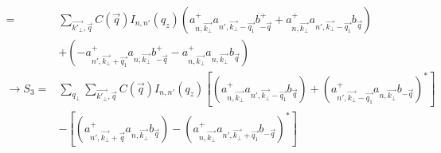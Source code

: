 \documentclass{article}
\begin{document}
\begin{align*}
    = &  \sum_{\vec{k'_\bot},\vec{q}}C\left(\vec{q}\right) I_{n,n'} \left(q_z\right) \left(a^+_{n, \vec{k_\bot}}a_{n', \vec{k_\bot}-\vec{q_1}} b^+_{-\vec{q}}+ a^+_{n, \vec{k_\bot}} a_{n', \vec{k_\bot} - \vec{q_1}}b_{\vec{q}} \right) \\
    & + \left(-a^+_{n',\vec{k_\bot} + \vec{q_1}} a_{n, \vec{k_\bot}} b^+_{- \vec{q}}
    - a^+_{n, \vec{k_\bot}}a_{n, \vec{k_\bot}}b_{\vec{q}} \right) \\
    \rightarrow S_3 = & \sum_{q_\bot} \sum_{\vec{k'_\bot},\vec{q}}C\left(\vec{q}\right) I_{n,n'} \left(q_z\right) \left[\left(a^+_{n, \vec{k_\bot}}a_{n',\vec{k_\bot} - \vec{q_1}}b_{\vec{q}}\right)+ \left(a^+_{n', \vec{k_\bot}-\vec{q_1}}a_{n, \vec{k_\bot}}b_{-\vec{q}}\right)^* \right] \\
    & - \left[\left(a^+_{n', \vec{k_\bot}+\vec{q}}a_{n, \vec{k_\bot}}b_{\vec{q}}\right)- \left(a^+_{n, \vec{k_\bot}}a_{n', \vec{k_\bot}+ \vec{q_1}}b_{-\vec{q}}\right)^*\right]
\end{align*}
\end{document}
